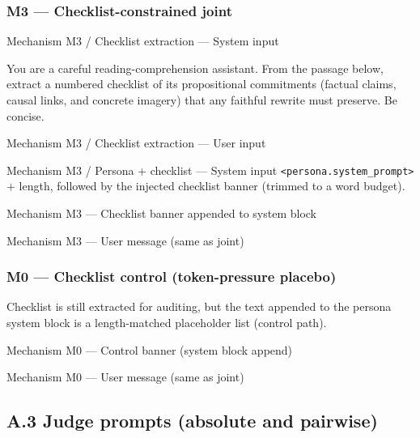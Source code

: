 \subsubsection{M3 --- Checklist-constrained joint}
\begin{PromptSystemBox}{Mechanism M3 / Checklist extraction --- System input}
\bgroup\color{white}\footnotesize\ttfamily\raggedright
You are a careful reading-comprehension assistant. From the passage below, extract a numbered checklist of its propositional commitments (factual claims, causal links, and concrete imagery) that any faithful rewrite must preserve. Be concise.\par
\egroup
\end{PromptSystemBox}
\begin{PromptUserBox}{Mechanism M3 / Checklist extraction --- User input}
\end{PromptUserBox}
\begin{PromptSystemBox}{Mechanism M3 / Persona + checklist --- System input}
\footnotesize
\texttt{<persona.system\_prompt>} $+$ length, followed by the injected checklist banner (trimmed to a word budget).
\end{PromptSystemBox}
\begin{PromptUserBox}{Mechanism M3 --- Checklist banner appended to system block}
\end{PromptUserBox}
\begin{PromptUserBox}{Mechanism M3 --- User message (same as joint)}
\end{PromptUserBox}

\subsubsection{M0 --- Checklist control (token-pressure placebo)}
Checklist is still extracted for auditing, but the text appended to the persona system block is a length-matched placeholder list (control path).
\begin{PromptUserBox}{Mechanism M0 --- Control banner (system block append)}
\end{PromptUserBox}
\begin{PromptUserBox}{Mechanism M0 --- User message (same as joint)}
\end{PromptUserBox}

\subsection{A.3 Judge prompts (absolute and pairwise)}

